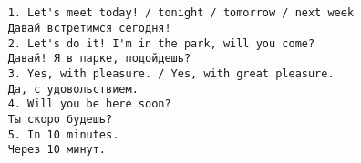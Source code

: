 \subsection*{}
\begin{verbatim}
    1. Let's meet today! / tonight / tomorrow / next week
    Давай встретимся сегодня!
    2. Let's do it! I'm in the park, will you come?
    Давай! Я в парке, подойдешь?
    3. Yes, with pleasure. / Yes, with great pleasure.
    Да, с удовольствием.
    4. Will you be here soon?
    Ты скоро будешь?
    5. In 10 minutes.
    Через 10 минут.
\end{verbatim}